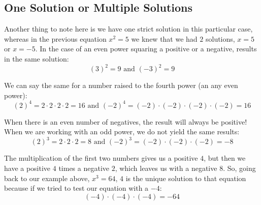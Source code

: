 %
%

\subsection{One Solution or Multiple Solutions}

Another thing to note here is we have one strict solution in this particular case, whereas in the previous equation $x^2=5$ we knew that we had $2$ solutions, $x = 5$ or $x = -5$. In the case of an even power squaring a positive or a negative, results in the same solution:
$$(3)^2 = 9 \text{    and    } (-3)^2 = 9$$

We can say the same for a number raised to the fourth power (an any even power):
$$(2)^4 = 2 \cdot 2 \cdot 2  \cdot 2 = 16 \text{    and    } (-2)^4 = (-2) \cdot (-2) \cdot (-2) \cdot (-2) = 16$$

When there is an even number of negatives, the result will always be positive! When we are working with an odd power, we do not yield the same results:
$$(2)^3 = 2 \cdot 2 \cdot 2 = 8 \text{    and    }  (-2)^3=(-2) \cdot (-2) \cdot (-2) = -8$$

The multiplication of the first two numbers gives us a positive $4$, but then we have a positive $4$ times a negative $2$, which leaves us with a negative $8$. So, going back to our example above, $x^3=64$, $4$ is the unique solution to that equation because if we tried to test our equation with a $-4$:
$$(-4) \cdot (-4)  \cdot (-4)= -64$$



